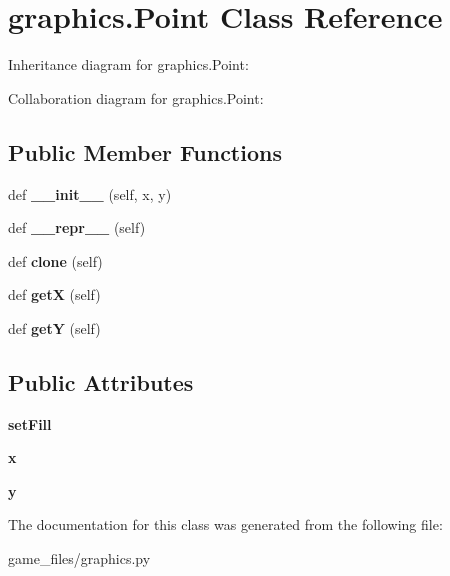 \hypertarget{classgraphics_1_1Point}{}\section{graphics.\+Point Class Reference}
\label{classgraphics_1_1Point}


Inheritance diagram for graphics.\+Point\+:


Collaboration diagram for graphics.\+Point\+:
\subsection*{Public Member Functions}
\begin{DoxyCompactItemize}
\item 
def {\bfseries \+\_\+\+\_\+init\+\_\+\+\_\+} (self, x, y)\hypertarget{classgraphics_1_1Point_ab8786043f14e834312522f9a2635ca1c}{}\label{classgraphics_1_1Point_ab8786043f14e834312522f9a2635ca1c}

\item 
def {\bfseries \+\_\+\+\_\+repr\+\_\+\+\_\+} (self)\hypertarget{classgraphics_1_1Point_a8dabf610e2e2a1ecdcdadfd16d7c42f6}{}\label{classgraphics_1_1Point_a8dabf610e2e2a1ecdcdadfd16d7c42f6}

\item 
def {\bfseries clone} (self)\hypertarget{classgraphics_1_1Point_a533526af5c8fbfe84c7c0924c4af7fb5}{}\label{classgraphics_1_1Point_a533526af5c8fbfe84c7c0924c4af7fb5}

\item 
def {\bfseries getX} (self)\hypertarget{classgraphics_1_1Point_a8a19d0055571c7f1d68df9e9624272a6}{}\label{classgraphics_1_1Point_a8a19d0055571c7f1d68df9e9624272a6}

\item 
def {\bfseries getY} (self)\hypertarget{classgraphics_1_1Point_a48fb2d02f2abf906972cfdae9698fa17}{}\label{classgraphics_1_1Point_a48fb2d02f2abf906972cfdae9698fa17}

\end{DoxyCompactItemize}
\subsection*{Public Attributes}
\begin{DoxyCompactItemize}
\item 
{\bfseries set\+Fill}\hypertarget{classgraphics_1_1Point_a407fd24b47309128a86e144baa128c09}{}\label{classgraphics_1_1Point_a407fd24b47309128a86e144baa128c09}

\item 
{\bfseries x}\hypertarget{classgraphics_1_1Point_a1ecd4579c57a7a0032a630a96bbe173c}{}\label{classgraphics_1_1Point_a1ecd4579c57a7a0032a630a96bbe173c}

\item 
{\bfseries y}\hypertarget{classgraphics_1_1Point_a30f1ec4104ee8cb436049ee7aceb8cf4}{}\label{classgraphics_1_1Point_a30f1ec4104ee8cb436049ee7aceb8cf4}

\end{DoxyCompactItemize}


The documentation for this class was generated from the following file\+:\begin{DoxyCompactItemize}
\item 
game\+\_\+files/graphics.\+py\end{DoxyCompactItemize}
